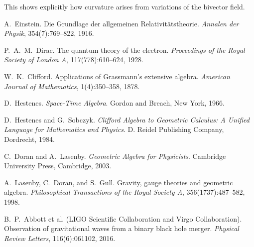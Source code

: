 \documentclass[11pt,a4paper]{article}
\numberwithin{equation}{section}
\theoremstyle{plain}
\theoremstyle{definition}
\theoremstyle{remark}
\begin{document}
This shows explicitly how curvature arises from variations of the bivector field.


\begin{thebibliography}{9}

A.~Einstein.
\newblock Die Grundlage der allgemeinen Relativitätstheorie.
\newblock \emph{Annalen der Physik}, 354(7):769--822, 1916.

P.~A.~M.~Dirac.
\newblock The quantum theory of the electron.
\newblock \emph{Proceedings of the Royal Society of London A}, 117(778):610--624, 1928.

W.~K.~Clifford.
\newblock Applications of Grassmann's extensive algebra.
\newblock \emph{American Journal of Mathematics}, 1(4):350--358, 1878.

D.~Hestenes.
\newblock \emph{Space-Time Algebra}.
\newblock Gordon and Breach, New York, 1966.

D.~Hestenes and G.~Sobczyk.
\newblock \emph{Clifford Algebra to Geometric Calculus: A Unified Language for Mathematics and Physics}.
\newblock D. Reidel Publishing Company, Dordrecht, 1984.

C.~Doran and A.~Lasenby.
\newblock \emph{Geometric Algebra for Physicists}.
\newblock Cambridge University Press, Cambridge, 2003.

A.~Lasenby, C.~Doran, and S.~Gull.
\newblock Gravity, gauge theories and geometric algebra.
\newblock \emph{Philosophical Transactions of the Royal Society A}, 356(1737):487--582, 1998.

B.~P.~Abbott et al. (LIGO Scientific Collaboration and Virgo Collaboration).
\newblock Observation of gravitational waves from a binary black hole merger.
\newblock \emph{Physical Review Letters}, 116(6):061102, 2016.

\end{thebibliography}
\end{document}
